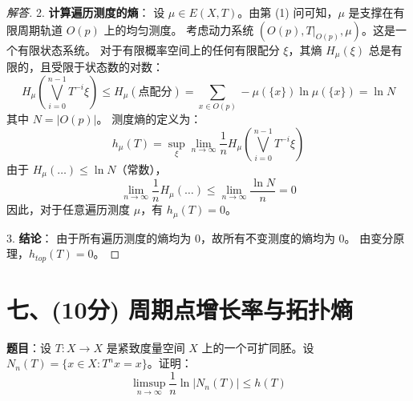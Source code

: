 \documentclass[a4paper,12pt]{article}
\newenvironment{solution}{\begin{proof}[解答]}{\end{proof}}
\begin{document}
\begin{enumerate}
\begin{solution}
        2. \textbf{计算遍历测度的熵}：
        设 $\mu \in E(X, T)$。由第 (1) 问可知，$\mu$ 是支撑在有限周期轨道 $O(p)$ 上的均匀测度。
        考虑动力系统 $(O(p), T|_{O(p)}, \mu)$。这是一个有限状态系统。
        对于有限概率空间上的任何有限配分 $\xi$，其熵 $H_\mu(\xi)$ 总是有限的，且受限于状态数的对数：
        $$ H_\mu(\bigvee_{i=0}^{n-1} T^{-i}\xi) \le H_\mu(\text{点配分}) = \sum_{x \in O(p)} -\mu(\{x\}) \ln \mu(\{x\}) = \ln N $$
        其中 $N = |O(p)|$。
        测度熵的定义为：
        $$ h_\mu(T) = \sup_\xi \lim_{n \to \infty} \frac{1}{n} H_\mu(\bigvee_{i=0}^{n-1} T^{-i}\xi) $$
        由于 $H_\mu(\dots) \le \ln N$（常数），
        $$ \lim_{n \to \infty} \frac{1}{n} H_\mu(\dots) \le \lim_{n \to \infty} \frac{\ln N}{n} = 0 $$
        因此，对于任意遍历测度 $\mu$，有 $h_\mu(T) = 0$。
        
        3. \textbf{结论}：
        由于所有遍历测度的熵均为 0，故所有不变测度的熵均为 0。
        由变分原理，$h_{top}(T) = 0$。
    \end{solution}
\end{enumerate}

\section*{七、(10分) 周期点增长率与拓扑熵}

\textbf{题目}：设 $T: X \to X$ 是紧致度量空间 $X$ 上的一个可扩同胚。设 $N_n(T) = \{x \in X : T^n x = x\}$。证明：
$$ \limsup_{n\to\infty} \frac{1}{n} \ln |N_n(T)| \le h(T) $$
\end{document}
